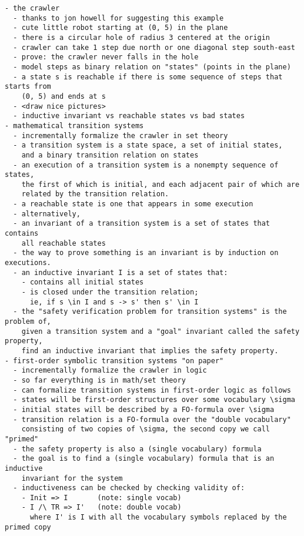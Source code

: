 \begin{verbatim}
- the crawler
  - thanks to jon howell for suggesting this example
  - cute little robot starting at (0, 5) in the plane
  - there is a circular hole of radius 3 centered at the origin
  - crawler can take 1 step due north or one diagonal step south-east
  - prove: the crawler never falls in the hole
  - model steps as binary relation on "states" (points in the plane)
  - a state s is reachable if there is some sequence of steps that starts from
    (0, 5) and ends at s
  - <draw nice pictures>
  - inductive invariant vs reachable states vs bad states
- mathematical transition systems
  - incrementally formalize the crawler in set theory
  - a transition system is a state space, a set of initial states,
    and a binary transition relation on states
  - an execution of a transition system is a nonempty sequence of states,
    the first of which is initial, and each adjacent pair of which are
    related by the transition relation.
  - a reachable state is one that appears in some execution
  - alternatively,
  - an invariant of a transition system is a set of states that contains
    all reachable states
  - the way to prove something is an invariant is by induction on executions.
  - an inductive invariant I is a set of states that:
    - contains all initial states
    - is closed under the transition relation;
      ie, if s \in I and s -> s' then s' \in I
  - the "safety verification problem for transition systems" is the problem of,
    given a transition system and a "goal" invariant called the safety property,
    find an inductive invariant that implies the safety property.
- first-order symbolic transition systems "on paper"
  - incrementally formalize the crawler in logic
  - so far everything is in math/set theory
  - can formalize transition systems in first-order logic as follows
  - states will be first-order structures over some vocabulary \sigma
  - initial states will be described by a FO-formula over \sigma
  - transition relation is a FO-formula over the "double vocabulary"
    consisting of two copies of \sigma, the second copy we call "primed"
  - the safety property is also a (single vocabulary) formula
  - the goal is to find a (single vocabulary) formula that is an inductive
    invariant for the system
  - inductiveness can be checked by checking validity of:
    - Init => I       (note: single vocab)
    - I /\ TR => I'   (note: double vocab)
      where I' is I with all the vocabulary symbols replaced by the primed copy
\end{verbatim}

